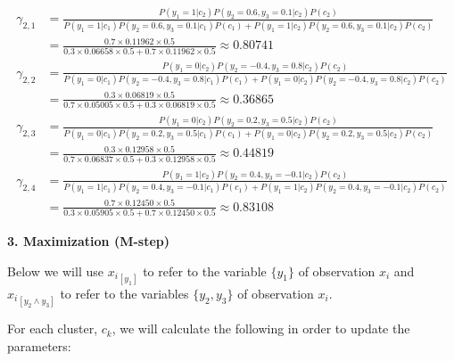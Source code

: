 \documentclass[12pt]{article}
\begin{document}
\begin{enumerate}[leftmargin=\labelsep]
          \vskip -0.5cm
          \begingroup
          \addtolength{\jot}{0.5em}
          \begin{align*}
              \gamma_{2,1} & = \frac{P(y_1=1|c_2)P(y_2=0.6,y_3=0.1|c_2)P(c_2)}{P(y_1=1|c_1)P(y_2=0.6,y_3=0.1|c_1)P(c_1) + P(y_1=1|c_2)P(y_2=0.6,y_3=0.1|c_2)P(c_2)} \\
                           & = \frac{0.7 \times 0.11962 \times 0.5}{0.3 \times 0.06658 \times 0.5 + 0.7 \times 0.11962 \times 0.5} \approx 0.80741 \\
              \gamma_{2,2} & = \frac{P(y_1=0|c_2)P(y_2=-0.4,y_3=0.8|c_2)P(c_2)}{P(y_1=0|c_1)P(y_2=-0.4,y_3=0.8|c_1)P(c_1) + P(y_1=0|c_2)P(y_2=-0.4,y_3=0.8|c_2)P(c_2)} \\
                           & = \frac{0.3 \times 0.06819 \times 0.5}{0.7 \times 0.05005 \times 0.5 + 0.3 \times 0.06819 \times 0.5} \approx 0.36865 \\
              \gamma_{2,3} & = \frac{P(y_1=0|c_2)P(y_2=0.2,y_3=0.5|c_2)P(c_2)}{P(y_1=0|c_1)P(y_2=0.2,y_3=0.5|c_1)P(c_1) + P(y_1=0|c_2)P(y_2=0.2,y_3=0.5|c_2)P(c_2)} \\
                           & = \frac{0.3 \times 0.12958 \times 0.5}{0.7 \times 0.06837 \times 0.5 + 0.3 \times 0.12958 \times 0.5} \approx 0.44819 \\
              \gamma_{2,4} & = \frac{P(y_1=1|c_2)P(y_2=0.4,y_3=-0.1|c_2)P(c_2)}{P(y_1=1|c_1)P(y_2=0.4,y_3=-0.1|c_1)P(c_1) + P(y_1=1|c_2)P(y_2=0.4,y_3=-0.1|c_2)P(c_2)} \\
                           & = \frac{0.7 \times 0.12450 \times 0.5}{0.3 \times 0.05905 \times 0.5 + 0.7 \times 0.12450 \times 0.5} \approx 0.83108
          \end{align*}
          \endgroup

          \vskip 0.2cm
          {
          \color{stepscolor}
          \begin{large}\textbf{3. Maximization (M-step)}\end{large}
          }
          \vskip 0.1cm

          Below we will use ${x_i}_{[y_1]}$ to refer to the variable $\{y_1\}$ of observation $x_i$ and
          ${x_i}_{[y_2 \land y_3]}$ to refer to the variables $\{y_2,y_3\}$ of observation $x_i$.

          For each cluster, $c_k$, we will calculate the following in order to update the parameters:


\end{enumerate}
\end{document}
